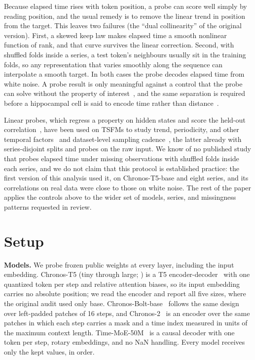 \documentclass{article}
\begin{document}
Because elapsed time rises with token position, a probe can score well simply by reading position, and the usual remedy is to remove the linear trend in position from the target.
This leaves two failures (the ``dual collinearity'' of the original version).
First, a skewed keep law makes elapsed time a smooth nonlinear function of rank, and that curve survives the linear correction.
Second, with shuffled folds inside a series, a test token's neighbours usually sit in the training folds, so any representation that varies smoothly along the sequence can interpolate a smooth target.
In both cases the probe decodes elapsed time from white noise.
A probe result is only meaningful against a control that the probe can solve without the property of interest~\citep{hewitt2019control}, and the same separation is required before a hippocampal cell is said to encode time rather than distance~\citep{kraus2013time}.

Linear probes, which regress a property on hidden states and score the held-out correlation~\citep{alain2017understanding,tenney2019bert,belinkov2022probing}, have been used on TSFMs to study trend, periodicity, and other temporal factors~\citep{wilinski2024exploring,pandey2025internal} and dataset-level sampling cadence~\citep{mavani2026observability}, the latter already with series-disjoint splits and probes on the raw input.
We know of no published study that probes elapsed time under missing observations with shuffled folds inside each series, and we do not claim that this protocol is established practice: the first version of this analysis used it, on Chronos-T5-base and eight series, and its correlations on real data were close to those on white noise.
The rest of the paper applies the controls above to the wider set of models, series, and missingness patterns requested in review.

\section{Setup}
\label{sec:setup}

\textbf{Models.}
We probe frozen public weights at every layer, including the input embedding.
Chronos-T5 (tiny through large; \citealp{ansari2024chronos}) is a T5 encoder-decoder~\citep{raffel2020t5} with one quantized token per step and relative attention biases, so its input embedding carries no absolute position; we read the encoder and report all five sizes, where the original audit used only base.
Chronos-Bolt-base~\citep{chronosbolt} follows the same design over left-padded patches of 16 steps, and Chronos-2~\citep{ansari2025chronos2} is an encoder over the same patches in which each step carries a mask and a time index measured in units of the maximum context length.
Time-MoE-50M~\citep{shi2025timemoe} is a causal decoder with one token per step, rotary embeddings, and no NaN handling.
Every model receives only the kept values, in order.
\end{document}

